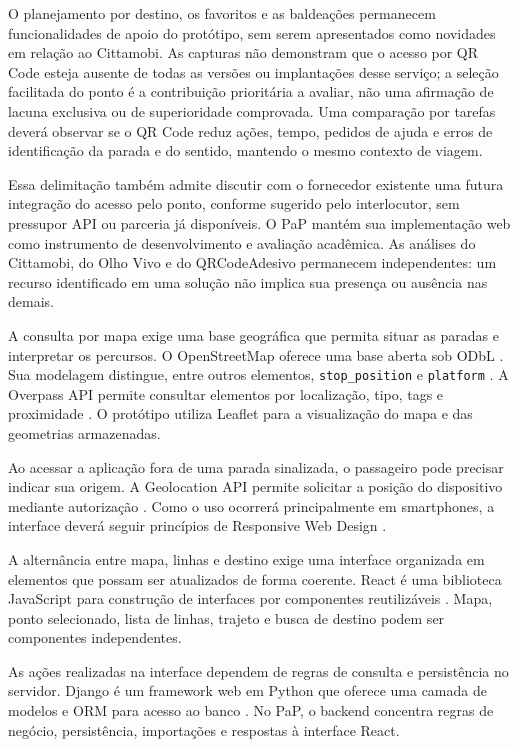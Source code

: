 \documentclass[12pt,oneside,a4paper,brazil,chapter=TITLE]{abntex2}
\begin{document}
O planejamento por destino, os favoritos e as baldeações permanecem funcionalidades de apoio do protótipo, sem serem apresentados como novidades em relação ao Cittamobi. As capturas não demonstram que o acesso por QR Code esteja ausente de todas as versões ou implantações desse serviço; a seleção facilitada do ponto é a contribuição prioritária a avaliar, não uma afirmação de lacuna exclusiva ou de superioridade comprovada. Uma comparação por tarefas deverá observar se o QR Code reduz ações, tempo, pedidos de ajuda e erros de identificação da parada e do sentido, mantendo o mesmo contexto de viagem.

Essa delimitação também admite discutir com o fornecedor existente uma futura integração do acesso pelo ponto, conforme sugerido pelo interlocutor, sem pressupor API ou parceria já disponíveis. O PaP mantém sua implementação web como instrumento de desenvolvimento e avaliação acadêmica. As análises do Cittamobi, do Olho Vivo e do QRCodeAdesivo permanecem independentes: um recurso identificado em uma solução não implica sua presença ou ausência nas demais.

A consulta por mapa exige uma base geográfica que permita situar as paradas e interpretar os percursos. O OpenStreetMap oferece uma base aberta sob ODbL \citep{osmlicense}. Sua modelagem distingue, entre outros elementos, \texttt{stop\_position} e \texttt{platform} \citep{osmpt}. A Overpass API permite consultar elementos por localização, tipo, tags e proximidade \citep{overpass}. O protótipo utiliza Leaflet para a visualização do mapa e das geometrias armazenadas.

Ao acessar a aplicação fora de uma parada sinalizada, o passageiro pode precisar indicar sua origem. A Geolocation API permite solicitar a posição do dispositivo mediante autorização \citep{geolocation}. Como o uso ocorrerá principalmente em smartphones, a interface deverá seguir princípios de Responsive Web Design \citep{responsive}.

A alternância entre mapa, linhas e destino exige uma interface organizada em elementos que possam ser atualizados de forma coerente. React é uma biblioteca JavaScript para construção de interfaces por componentes reutilizáveis \citep{react}. Mapa, ponto selecionado, lista de linhas, trajeto e busca de destino podem ser componentes independentes.

As ações realizadas na interface dependem de regras de consulta e persistência no servidor. Django é um framework web em Python que oferece uma camada de modelos e ORM para acesso ao banco \citep{django}. No PaP, o backend concentra regras de negócio, persistência, importações e respostas à interface React.
\end{document}
